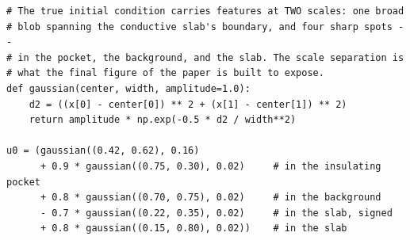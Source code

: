 \begin{verbatim}
# The true initial condition carries features at TWO scales: one broad
# blob spanning the conductive slab's boundary, and four sharp spots --
# in the pocket, the background, and the slab. The scale separation is
# what the final figure of the paper is built to expose.
def gaussian(center, width, amplitude=1.0):
    d2 = ((x[0] - center[0]) ** 2 + (x[1] - center[1]) ** 2)
    return amplitude * np.exp(-0.5 * d2 / width**2)

u0 = (gaussian((0.42, 0.62), 0.16)
      + 0.9 * gaussian((0.75, 0.30), 0.02)     # in the insulating pocket
      + 0.8 * gaussian((0.70, 0.75), 0.02)     # in the background
      - 0.7 * gaussian((0.22, 0.35), 0.02)     # in the slab, signed
      + 0.8 * gaussian((0.15, 0.80), 0.02))    # in the slab
\end{verbatim}
